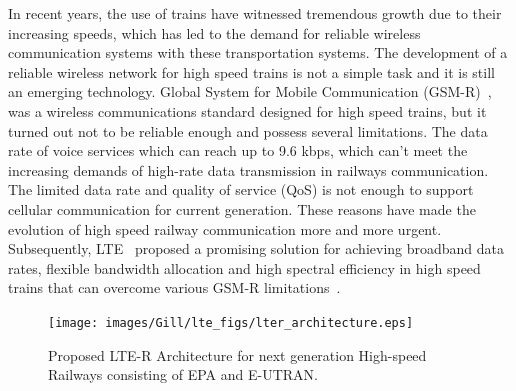 In recent years, the use of trains have witnessed tremendous growth due to their increasing speeds, which has led to the demand for reliable wireless communication systems with these transportation systems. The development of a reliable wireless network for high speed trains is not a simple task and it is still an emerging technology. Global System for Mobile
Communication (GSM-R)~\cite{trlter1}, was a wireless communications standard designed for high speed trains, but it turned out not to be reliable enough and possess several limitations. The data rate of voice services which can reach up to 9.6 kbps, which can't meet the increasing demands of high-rate data transmission in railways communication. The limited data rate and quality of service (QoS) is not enough to support cellular communication for current generation. These reasons have made the evolution of high speed railway communication more and more urgent.  Subsequently, LTE~\cite{trlter2} proposed a promising solution for achieving broadband data rates, flexible bandwidth allocation and high spectral efficiency in high speed trains that can overcome various GSM-R limitations~\cite{arlter3,inplter4}.

\begin{figure}[!ht]
\centering
\texttt{[image: images/Gill/lte\_figs/lter\_architecture.eps]} 
\caption{Proposed LTE-R Architecture for next generation High-speed Railways consisting of EPA and E-UTRAN.}
\label{ltearch}
\end{figure}

